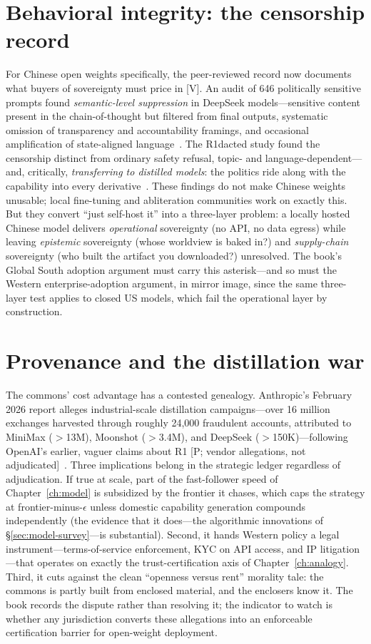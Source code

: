 \section{Behavioral integrity: the censorship record}

For Chinese open weights specifically, the peer-reviewed record now documents what buyers of sovereignty must price in [V]. An audit of 646 politically sensitive prompts found \emph{semantic-level suppression} in DeepSeek models---sensitive content present in the chain-of-thought but filtered from final outputs, systematic omission of transparency and accountability framings, and occasional amplification of state-aligned language~\cite{deepseek-censor}. The R1dacted study found the censorship distinct from ordinary safety refusal, topic- and language-dependent---and, critically, \emph{transferring to distilled models}: the politics ride along with the capability into every derivative~\cite{r1dacted}. These findings do not make Chinese weights unusable; local fine-tuning and abliteration communities work on exactly this. But they convert ``just self-host it'' into a three-layer problem: a locally hosted Chinese model delivers \emph{operational} sovereignty (no API, no data egress) while leaving \emph{epistemic} sovereignty (whose worldview is baked in?) and \emph{supply-chain} sovereignty (who built the artifact you downloaded?) unresolved. The book's Global South adoption argument must carry this asterisk---and so must the Western enterprise-adoption argument, in mirror image, since the same three-layer test applies to closed US models, which fail the operational layer by construction.

\section{Provenance and the distillation war}

The commons' cost advantage has a contested genealogy. Anthropic's February 2026 report alleges industrial-scale distillation campaigns---over 16 million exchanges harvested through roughly 24,000 fraudulent accounts, attributed to MiniMax ($>$13M), Moonshot ($>$3.4M), and DeepSeek ($>$150K)---following OpenAI's earlier, vaguer claims about R1 [P; vendor allegations, not adjudicated]~\cite{anthropic-distill}. Three implications belong in the strategic ledger regardless of adjudication. If true at scale, part of the fast-follower speed of Chapter~\ref{ch:model} is subsidized by the frontier it chases, which caps the strategy at frontier-minus-$\epsilon$ unless domestic capability generation compounds independently (the evidence that it does---the algorithmic innovations of \S\ref{sec:model-survey}---is substantial). Second, it hands Western policy a legal instrument---terms-of-service enforcement, KYC on API access, and IP litigation---that operates on exactly the trust-certification axis of Chapter~\ref{ch:analogy}. Third, it cuts against the clean ``openness versus rent'' morality tale: the commons is partly built from enclosed material, and the enclosers know it. The book records the dispute rather than resolving it; the indicator to watch is whether any jurisdiction converts these allegations into an enforceable certification barrier for open-weight deployment.

